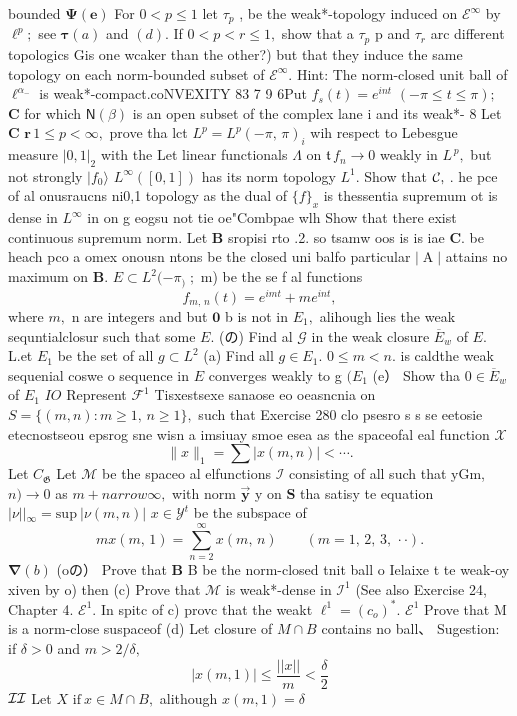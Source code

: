 bounded $\mathbf{\Psi}({\boldsymbol{e}})$ For $0<p\leq1$ let $\tau_{p}$ , be the weak*-topology induced on ${\mathcal{E}}^{\infty}$ by $\ell^{p};$ see $\mathbf{\tau}(a)$ and $\scriptstyle(d).$ If $0<p<r\leq1,$ show that a $\tau_{p}$ p and $\tau_{r}$ arc different topologics Gis one wcaker than the other?) but that they induce the same topology on each norm-bounded subset of ${\mathcal{E}}^{\infty}.$ Hint: The norm-closed unit ball of $\ell^{\alpha_{-}}$ is weak*-compact.coNVEXITY 83 7 9 6Put $f_{s}(t)=e^{i n t}$ $(-\pi\leq t\leq\pi);$ ${\boldsymbol{C}}$ for which ${\mathsf{N}}(\beta)$ is an open subset of the complex lane i and its weak*- 8 Let ${\boldsymbol{C}}$ $\mathbf{r}\,1\leq p<\infty,$ prove tha lct $L^{p}=L^{p}(-\pi,\,\pi)_{i}$ wih respect to Lebesgue measure $|0,1|_{2}$ with the Let linear functionals $\Lambda$ on ${\mathfrak{t}}\,f_{n}\to0$ weakly in $L^{\,p},$ but not strongly $|f_{0}\rangle$ $L^{\infty}([0,1])$ has its norm topology $L^{1}.$ Show that ${\cal{C}},$ . he pce of al onusraucns ni0,1 topology as the dual of $\scriptstyle\{f\}_{x}$ is thessentia supremum ot is dense in $L^{\infty}$ in on g eogsu not tie oe"Combpae wlh Show that there exist continuous supremum norm. Let $\boldsymbol{B}$ sropisi rto .2. so tsamw oos is is iae ${\boldsymbol{C}}.$ be heach pco a omex onousn ntons be the closed uni balfo particular $|\operatorname{A}|$ attains no maximum on ${\boldsymbol{B}}.$ $E\subset L^{2}(-\pi_{)}\;;$ m) be the se f al functions $$ f_{m,\,n}(t)=e^{i m t}+m e^{i n t}, $$ where $m,$ n are integers and but $\mathbf{0}$ b is not in $E_{1},$ alihough lies the weak sequntialclosur such that some $E.$ (の) Find al $\scriptstyle{\mathcal{G}}$ in the weak closure ${\overline{{E}}}_{w}$ of $E.$ L.et $E_{1}$ be the set of all $g\subset L^{2}$ (a) Find all $g\in E_{1}.$ $0\leq m<n.$ is caldthe weak sequenial coswe o sequence in $\boldsymbol{\mathit{E}}$ converges weakly to g $(E_{1}$ (e） Show tha $0\in{\overline{{E}}}_{w}$ of $E_{1}$ $I O$ Represent ${\mathcal{F}}^{1}$ Tisxestsexe sanaose eo oeasncnia on $S=\{(m,n)\colon m\geq1,\,n\geq1\},$ such that Exercise 280 clo psesro s s se eetosie etecnostseou epsrog sne wisn a imsiuay smoe esea as the spaceofal eal function $\scriptstyle{\mathcal{X}}$ $$ \|x\|_{1}=\sum|x(m,n)|<\cdots. $$ Let $C_{\mathfrak{G}}$ Let $\mathcal{M}$ be the spaceo al elfunctions ${\mathcal{I}}$ consisting of all such that yGm, $n)\to0$ as $m+n arrow\infty,$ with norm $\mathbf{\vec{y}}$ y on $\boldsymbol{S}$ tha satisy te equation $|\nu||_{\infty}={\mathrm{sup}}\ |\nu(m,n)|$ $x\in{\mathcal{Y}}^{t}$ be the subspace of $$ m x(m,\,1)=\sum_{n=2}^{\infty}x(m,\,n)\qquad(m=1,\,2,\,3,\,\cdot\cdot). $$ $\mathbf{\nabla}(b)$ (oの） Prove that $\boldsymbol{B}$ B be the norm-closed tnit ball o Ielaixe t te weak-oy xiven by o) then (c) Prove that $\mathcal{M}$ is weak*-dense in ${\mathcal{I}}^{1}$ (See also Exercise 24, Chapter 4. ${\mathcal{E}}^{1}.$ In spitc of c) provc that the weakt $\ell^{1}=(c_{o})^{*}.$ ${\mathcal{E}}^{1}$ Prove that M is a norm-close suspaceof (d) Let closure of $M\cap B$ contains no ball、 Sugestion: if $\delta>0$ and $m>2/\delta,$ $$ |x(m,1)|\leq{\frac{||x||}{m}}<\frac{\delta}{2} $$ ${\cal I}{\cal I}$ Let $\textstyle X$ ${\mathrm{if~}}x\in M\cap B,$ alithough $x(m,1)=\delta$ 